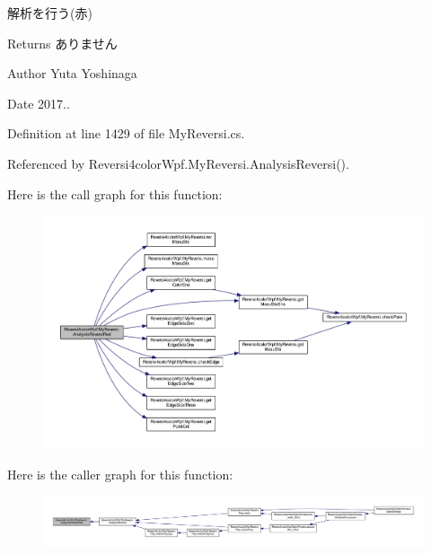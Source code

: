 解析を行う(赤) 

\begin{DoxyReturn}{Returns}
ありません 
\end{DoxyReturn}
\begin{DoxyAuthor}{Author}
Yuta Yoshinaga 
\end{DoxyAuthor}
\begin{DoxyDate}{Date}
2017.. 
\end{DoxyDate}


Definition at line 1429 of file My\+Reversi.\+cs.



Referenced by Reversi4color\+Wpf.\+My\+Reversi.\+Analysis\+Reversi().

Here is the call graph for this function\+:
\nopagebreak
\begin{figure}[H]
\begin{center}
\leavevmode
\includegraphics[width=350pt]{class_reversi4color_wpf_1_1_my_reversi_afb6eb8a1ecd5bb4498425bea6103f261_cgraph}
\end{center}
\end{figure}
Here is the caller graph for this function\+:
\nopagebreak
\begin{figure}[H]
\begin{center}
\leavevmode
\includegraphics[width=350pt]{class_reversi4color_wpf_1_1_my_reversi_afb6eb8a1ecd5bb4498425bea6103f261_icgraph}
\end{center}
\end{figure}
\mbox{\label{class_reversi4color_wpf_1_1_my_reversi_a93276b74fb1de8525be31615ff03427e}} 
